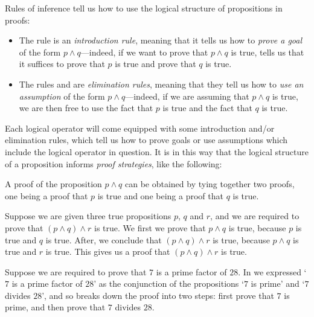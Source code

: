 Rules of inference tell us how to use the logical structure of propositions in proofs:

\begin{itemize}
\item The rule \introrule{\wedge} is an \textit{introduction rule}, meaning that it tells us how to \textit{prove a goal} of the form $p \wedge q$---indeed, if we want to prove that $p \wedge q$ is true, \introrule{\wedge} tells us that it suffices to prove that $p$ is true and prove that $q$ is true.

\item The rules  and  are \textit{elimination rules}, meaning that they tell us how to \textit{use an assumption} of the form $p \wedge q$---indeed, if we are assuming that $p \wedge q$ is true, we are then free to use the fact that $p$ is true and the fact that $q$ is true.
\end{itemize}

Each logical operator will come equipped with some introduction and/or elimination rules, which tell us how to prove goals or use assumptions which include the logical operator in question. It is in this way that the logical structure of a proposition informs \textit{proof strategies}, like the following:

\begin{strategy}
\label{strProvingConjunctionsDirect}
A proof of the proposition $p \wedge q$ can be obtained by tying together two proofs, one being a proof that $p$ is true and one being a proof that $q$ is true.
\end{strategy}

\begin{example}
\label{abstractConjunctionProof}
Suppose we are given three true propositions $p$, $q$ and $r$, and we are required to prove that $(p \wedge q) \wedge r$ is true. 
We first we prove that $p \wedge q$ is true, because $p$ is true and $q$ is true. After, we conclude that $(p \wedge q) \wedge r$ is true, because $p \wedge q$ is true and $r$ is true. This gives us a proof that $(p \wedge q) \wedge r$ is true.
\end{example}

\begin{example}
\label{exSevenDividesTwentyEightConjunctionProof}
Suppose we are required to prove that $7$ is a prime factor of $28$. In  we expressed `$7$ is a prime factor of $28$' as the conjunction of the propositions `$7$ is prime' and `$7$ divides $28$', and so  breaks down the proof into two steps: first prove that $7$ is prime, and then prove that $7$ divides $28$.
\end{example}


